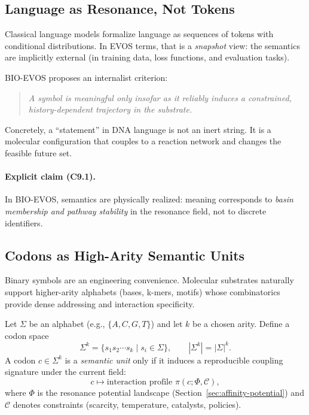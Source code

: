 \documentclass[11pt]{article}
\begin{document}
\subsection{Language as Resonance, Not Tokens}
\label{sec:language-as-resonance}

Classical language models formalize language as sequences of tokens with conditional
distributions. In EVOS terms, that is a \emph{snapshot} view: the semantics are
implicitly external (in training data, loss functions, and evaluation tasks).

BIO-EVOS proposes an internalist criterion:

\begin{quote}
\emph{A symbol is meaningful only insofar as it reliably induces a constrained,
history-dependent trajectory in the substrate.}
\end{quote}

Concretely, a ``statement'' in DNA language is not an inert string. It is a molecular
configuration that couples to a reaction network and changes the feasible future set.

\paragraph{Explicit claim (C9.1).}
In BIO-EVOS, semantics are physically realized: meaning corresponds to \emph{basin
membership and pathway stability} in the resonance field, not to discrete identifiers.

\subsection{Codons as High-Arity Semantic Units}
\label{sec:codons-high-arity}

Binary symbols are an engineering convenience. Molecular substrates naturally support
higher-arity alphabets (bases, k-mers, motifs) whose combinatorics provide dense
addressing and interaction specificity.

Let $\Sigma$ be an alphabet (e.g., $\{A,C,G,T\}$) and let $k$ be a chosen arity. Define a
codon space
\[
\Sigma^k = \{ s_1s_2\cdots s_k \mid s_i \in \Sigma \},
\qquad |\Sigma^k| = |\Sigma|^k.
\]
A codon $c\in\Sigma^k$ is a \emph{semantic unit} only if it induces a reproducible
coupling signature under the current field:
\[
c \mapsto \text{interaction profile } \pi(c;\Phi,\mathcal{C}),
\]
where $\Phi$ is the resonance potential landscape (Section~\ref{sec:affinity-potential})
and $\mathcal{C}$ denotes constraints (scarcity, temperature, catalysts, policies).
\end{document}
